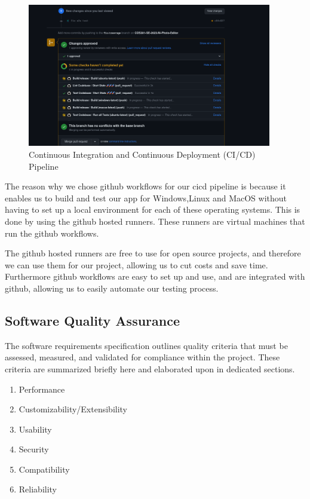 \documentclass[11pt,a4paper]{article}
\begin{document}
\begin{figure}[htbp]
  \centering
  \includegraphics[width=0.95\textwidth]{../pics/cicd.png}
  \caption{Continuous Integration and Continuous Deployment (CI/CD) Pipeline}
\end{figure}

The reason why we chose github workflows for our cicd pipeline is because it enables us to build and test our app for Windows,Linux and MacOS without having to set up a local environment for each of these operating systems.
This is done by using the github hosted runners. These runners are virtual machines that run the github workflows. 

The github hosted runners are free to use for open source projects, and therefore we can use them for our project,
allowing us to cut costs and save time. Furthermore github workflows are easy to set up and use, and are integrated with github, allowing us to easily automate our testing process.

\subsection*{Software Quality Assurance}

The software requirements specification outlines quality criteria that must be assessed, measured, and validated for compliance within the project. 
These criteria are summarized briefly here and elaborated upon in dedicated sections.

\begin{enumerate}[label*=\arabic*.]
  \item Performance
  \item Customizability/Extensibility
  \item Usability
  \item Security
  \item Compatibility
  \item Reliability
\end{enumerate}
\end{document}
